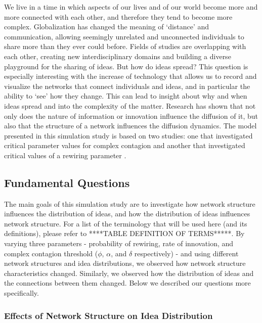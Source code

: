 
We live in a time in which aspects of our lives and of our world become more and more connected with each other, and therefore they tend to become more complex. Globalization has changed the meaning of `distance' and communication, allowing seemingly unrelated and unconnected individuals to share more than they ever could before. Fields of studies are overlapping with each other, creating new interdisciplinary domains and building a diverse playground for the sharing of ideas. But how do ideas spread? This question is especially interesting with the increase of technology that allows us to record and visualize the networks that connect individuals and ideas, and in particular the ability to `see' how they change. This can lead to insight about why and when ideas spread and into the complexity of the matter. Research has shown that not only does the nature of information or innovation influence the diffusion of it, but also that the structure of a network influences the diffusion dynamics. The model presented in this simulation study is based on two studies: one that investigated critical parameter values for complex contagion \citep{CM2007} and another that investigated critical values of a rewiring parameter \citep{HN2006}.

\subsection{Fundamental Questions}

The main goals of this simulation study are to investigate how network structure influences the distribution of ideas, and how the distribution of ideas influences network structure. For a list of the terminology that will be used here (and its definitions), please refer to ****TABLE DEFINITION OF TERMS*****. By varying three parameters - probability of rewiring, rate of innovation, and complex contagion threshold ($\phi$, $\alpha$, and $\delta$ respectively) - and using different network structures and idea distributions, we observed how network structure characteristics changed. Similarly, we observed how the distribution of ideas and the connections between them changed. Below we described our questions more specifically.


\subsubsection{Effects of Network Structure on Idea Distribution}

